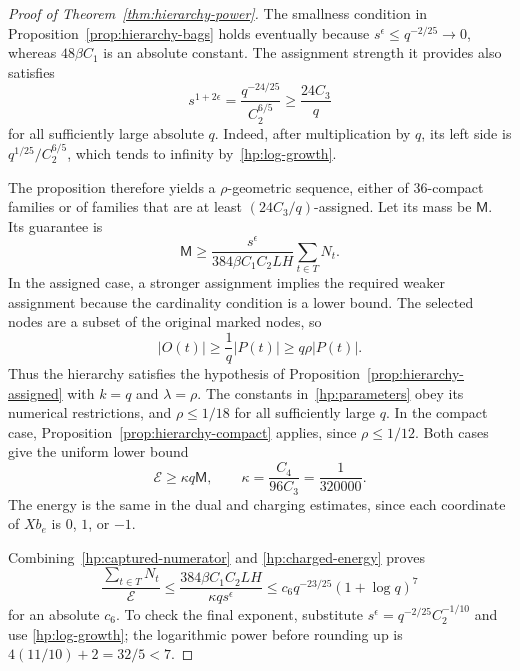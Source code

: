 \documentclass[11pt]{amsart}
\theoremstyle{definition}
\theoremstyle{remark}
\numberwithin{equation}{section}
\begin{document}
\begin{proof}[Proof of Theorem~\ref{thm:hierarchy-power}]
The smallness condition in Proposition~\ref{prop:hierarchy-bags} holds
eventually because $s^\epsilon\le q^{-2/25}\to0$, whereas
$48\beta C_1$ is an absolute constant.  The assignment strength it
provides also satisfies
\begin{equation}\label{hp:assignment-strength}
 s^{1+2\epsilon}=\frac{q^{-24/25}}{C_2^{6/5}}
 \ge\frac{24C_3}{q}
\end{equation}
for all sufficiently large absolute $q$.  Indeed, after multiplication
by $q$, its left side is $q^{1/25}/C_2^{6/5}$, which tends to infinity
by~\eqref{hp:log-growth}.

The proposition therefore yields a $\rho$-geometric sequence, either
of $36$-compact families or of families that are at least
$(24C_3/q)$-assigned.  Let its mass be $\mathsf M$.  Its guarantee is
\begin{equation}\label{hp:captured-numerator}
 \mathsf M\ge
 \frac{s^\epsilon}{384\beta C_1C_2LH}\sum_{t\in T}N_t.
\end{equation}
In the assigned case, a stronger assignment implies the required weaker
assignment because the cardinality condition is a lower bound.  The
selected nodes are a subset of the original marked nodes, so
\[
 |O(t)|\ge\frac1q|P(t)|\ge q\rho|P(t)|.
\]
Thus the hierarchy satisfies the hypothesis of
Proposition~\ref{prop:hierarchy-assigned} with $k=q$ and $\lambda=\rho$.
The constants in~\eqref{hp:parameters} obey its numerical restrictions,
and $\rho\le1/18$ for all sufficiently large $q$.  In the compact
case, Proposition~\ref{prop:hierarchy-compact} applies, since
$\rho\le1/12$.  Both cases give the uniform lower bound
\begin{equation}\label{hp:charged-energy}
 \mathcal E\ge\kappa q\mathsf M,
 \qquad \kappa=\frac{C_4}{96C_3}=\frac1{320000}.
\end{equation}
The energy is the same in the dual and charging estimates, since each
coordinate of $Xb_e$ is $0$, $1$, or $-1$.

Combining~\eqref{hp:captured-numerator} and
\eqref{hp:charged-energy} proves
\begin{equation}\label{hp:bad}
 \frac{\sum_{t\in T}N_t}{\mathcal E}
 \le\frac{384\beta C_1C_2LH}{\kappa q s^\epsilon}
 \le c_6 q^{-23/25}(1+\log q)^7
\end{equation}
for an absolute $c_6$.  To check the final exponent, substitute
$s^\epsilon=q^{-2/25}C_2^{-1/10}$ and use
\eqref{hp:log-growth}; the logarithmic power before rounding up is
$4(11/10)+2=32/5<7$.


\end{proof}
\end{document}
